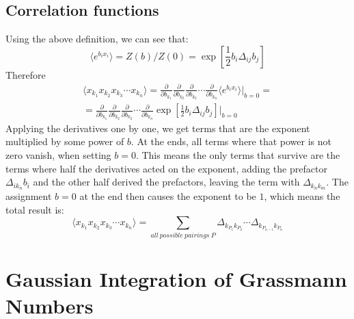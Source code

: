 \documentclass{article}
\begin{document}
\subsection{Correlation functions}
Using the above definition, we can see that:
\begin{equation}
    \langle e^{b_i x_i} \rangle = Z(b)/Z(0) = \exp[\frac{1}{2}b_i\Delta_{ij}b_j]
\end{equation}
Therefore
\begin{equation}
\begin{gathered}
    \langle x_{k_1} x_{k_2} x_{k_3} \cdots  x_{k_n} \rangle = \frac{\partial}{\partial b_{k_1}} \frac{\partial}{\partial b_{k_2}} \frac{\partial}{\partial b_{k_2}} \cdots \frac{\partial}{\partial b_{k_n}} \langle e^{b_i x_i} \rangle \Big|_{b=0} = \\ =
    \frac{\partial}{\partial b_{k_1}} \frac{\partial}{\partial b_{k_2}} \frac{\partial}{\partial b_{k_2}} \cdots \frac{\partial}{\partial b_{k_n}} \exp[\frac{1}{2}b_i\Delta_{ij}b_j] \Big|_{b=0}
\end{gathered}
\end{equation}
Applying the derivatives one by one, we get terms that are the exponent multiplied by some power of $b$. At the ends, all terms where that power is not zero vanish, when setting $b = 0$. This means the only terms that survive are the terms where half the derivatives acted on the exponent, adding the prefactor $\Delta_{ik_n}b_i$ and the other half derived the prefactors, leaving the term with $\Delta_{k_nk_m}$. The assignment $b = 0$ at the end then causes the exponent to be $1$, which means the total result is:
\begin{equation}
    \langle x_{k_1} x_{k_2} x_{k_3} \cdots  x_{k_n} \rangle = \sum_{all \ possible \ pairings \ P} \Delta_{k_{P_1}k_{P_2}} \cdots \Delta_{k_{P_{n-1}}k_{P_n}}
\end{equation}

\section{Gaussian Integration of Grassmann Numbers}
\end{document}

